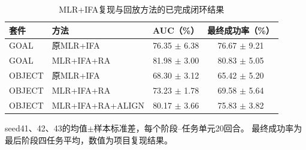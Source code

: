 \begin{table}[htbp]
\centering
\caption{MLR+IFA复现与回放方法的已完成闭环结果}
\label{tab:preliminary-baselines}
\begin{tabular}{llcc}
\toprule
套件 & 方法 & AUC（\%） & 最终成功率（\%） \\
\midrule
GOAL & 原MLR+IFA & 76.35 $\pm$ 6.38 & 76.67 $\pm$ 9.21 \\
GOAL & MLR+IFA+RA & 81.98 $\pm$ 3.00 & 80.83 $\pm$ 5.05 \\
OBJECT & 原MLR+IFA & 68.30 $\pm$ 3.12 & 65.42 $\pm$ 5.20 \\
OBJECT & MLR+IFA+RA & 73.23 $\pm$ 1.78 & 69.58 $\pm$ 5.64 \\
OBJECT & MLR+IFA+RA+ALIGN & 80.17 $\pm$ 3.66 & 75.83 $\pm$ 3.82 \\
\bottomrule
\end{tabular}
\par\smallskip
{\footnotesize seed41、42、43的均值$\pm$样本标准差，每个阶段--任务单元20回合。
最终成功率为最后阶段四任务平均，数值为项目复现结果。}
\end{table}
